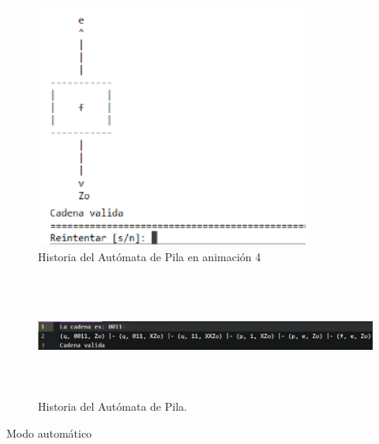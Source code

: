 	\begin{figure}[H]
		\begin{center}
			\includegraphics[width=9cm, height=8cm]{img/pila-manual-consola4.png}
			\caption{Historia del Autómata de Pila en animación 4}
			\label{fig:pila1d}
		\end{center}
	\end{figure}
	\begin{figure}[H]
		\begin{center}
			\includegraphics[width=\linewidth, height=4cm]{img/pila-manual-archivo.png}
			\caption{Historia del Autómata de Pila.}
			\label{fig:pila2}
		\end{center}
	\end{figure}
	\newpage
	{\large Modo automático}
